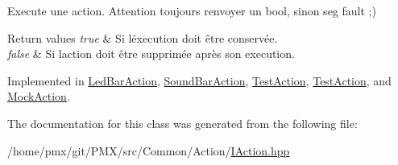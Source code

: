 Execute une action. Attention toujours renvoyer un bool, sinon seg fault ;) 


\begin{DoxyRetVals}{Return values}
{\em true} & Si l\textquotesingle{}éxecution doit être conservée. \\
\hline
{\em false} & Si l\textquotesingle{}action doit être supprimée après son execution. \\
\hline
\end{DoxyRetVals}


Implemented in \hyperlink{classLedBarAction_a67bc2c636064156c80319623b88ec5e8}{Led\+Bar\+Action}, \hyperlink{classSoundBarAction_ad080a35d375a14b912ed5d2625c0b687}{Sound\+Bar\+Action}, \hyperlink{classTestAction_a80c76775fe017bd75bc3c23abcbafb43}{Test\+Action}, \hyperlink{classTestAction_abc2406605ef5655ea05fb3eaf2a74051}{Test\+Action}, and \hyperlink{classMockAction_ad7f3909b21271f52aaa5205458925b8b}{Mock\+Action}.



The documentation for this class was generated from the following file\+:\begin{DoxyCompactItemize}
\item 
/home/pmx/git/\+P\+M\+X/src/\+Common/\+Action/\hyperlink{IAction_8hpp}{I\+Action.\+hpp}\end{DoxyCompactItemize}
